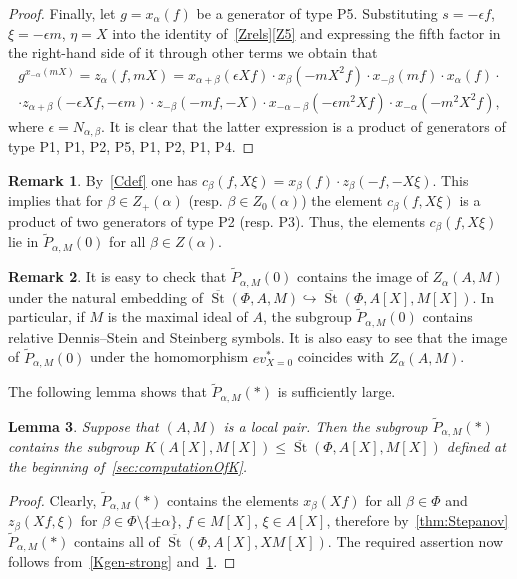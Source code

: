 \documentclass[10pt,a4paper,twoside]{article}
\newtheorem{lemma}{Lemma}
\theoremstyle{remark}
\theoremstyle{definition}
\numberwithin{lemma}{section}
\numberwithin{prop}{section}
\numberwithin{corollary}{section}
\numberwithin{externaltheorem}{section}
\newtheorem{rem}[lemma]{Remark}
\DeclareMathOperator{\St}{St}
\numberwithin{equation}{section}
\begin{document}
\begin{proof}
Finally, let $g = x_\alpha(f)$ be a generator of type P5. Substituting $s = -\epsilon f$, $\xi = -\epsilon m$, $\eta=X$ into the identity of~\cref{Zrels}\ref{Z5} and expressing the fifth factor in the right-hand side of it through other terms we obtain that
\begin{multline} \label{eq:zalpha} g^{x_{-\alpha}(mX)} = z_\alpha(f, mX) = x_{\alpha+\beta}(\epsilon Xf) \cdot x_{\beta}(-mX^2 f) \cdot x_{-\beta}(mf) \cdot x_\alpha(f) \cdot \\ 
 \cdot z_{\alpha+\beta}(-\epsilon X f, -\epsilon m) \cdot z_{-\beta}(-mf, -X) \cdot x_{-\alpha-\beta}(-\epsilon m^2X f) \cdot x_{-\alpha}(-m^2X^2 f), \end{multline}
where $\epsilon = N_{\alpha, \beta}$. It is clear that the latter expression is a product of generators of type P1, P1, P2, P5, P1, P2, P1, P4. \end{proof}

\begin{rem}\label{rem:c} By~\eqref{Cdef} one has $c_\beta(f, X\xi) = x_{\beta} (f) \cdot z_{\beta}(-f, -X\xi)$. This implies that for $\beta \in Z_+(\alpha)$ (resp. $\beta \in Z_0(\alpha)$) the element $c_\beta(f, X\xi)$ is a product of two generators of type P2 (resp. P3).
Thus, the elements $c_{\beta}(f, X\xi)$ lie in $\widetilde{P}_{\alpha, M}(0)$ for all $\beta \in Z(\alpha)$. \end{rem}
\begin{rem}\label{rem:DS}
It is easy to check that $\widetilde{P}_{\alpha, M}(0)$ contains the image of $Z_\alpha(A, M)$ under the natural embedding of $\overline{\St}(\Phi, A, M) \hookrightarrow \overline{\St}(\Phi, A[X], M[X])$.
In particular, if $M$ is the maximal ideal of $A$, the subgroup $\widetilde{P}_{\alpha, M}(0)$ contains relative Dennis--Stein and Steinberg symbols. It is also easy to see that the image of $\widetilde{P}_{\alpha, M}(0)$ under the homomorphism $ev_{X=0}^*$ coincides with $Z_\alpha(A, M)$. \end{rem}

The following lemma shows that $\widetilde{P}_{\alpha, M}(*)$ is sufficiently large.
\begin{lemma} \label{Pstar-large} Suppose that $(A, M)$ is a local pair. 
Then the subgroup $\widetilde{P}_{\alpha, M}(*)$ contains the subgroup $K(A[X], M[X]) \leq \overline{\St}(\Phi, A[X], M[X])$ defined at the beginning of~\cref{sec:computationOfK}. \end{lemma}
\begin{proof} Clearly, $\widetilde{P}_{\alpha, M}(*)$ contains the elements $x_\beta(Xf)$ for all $\beta \in \Phi$ and $z_\beta(Xf, \xi)$ for $\beta \in \Phi \setminus \{\pm \alpha\}$, $f \in M[X]$, $\xi\in A[X]$, therefore by~\cref{thm:Stepanov} $\widetilde{P}_{\alpha, M}(*)$ contains all of $\overline{\St}(\Phi, A[X], XM[X])$. The required assertion now follows from~\cref{Kgen-strong} and~\cref{rem:c}. \end{proof}
\end{document}
